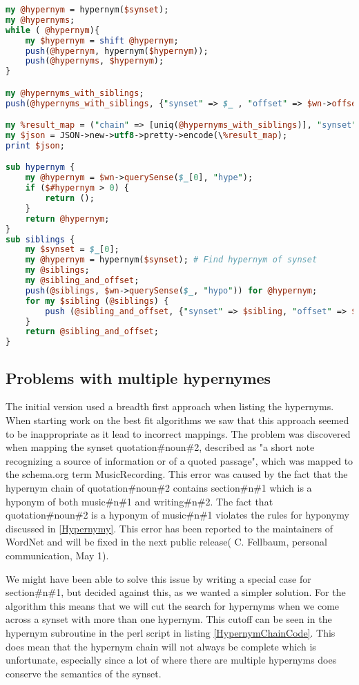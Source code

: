 \begin{lstlisting}[language=perl, label=HypernymChainCode, caption={Excerpt from the hypernym chain perl script}]
my @hypernym = hypernym($synset);
my @hypernyms;
while ( @hypernym){
	my $hypernym = shift @hypernym;
	push(@hypernym, hypernym($hypernym));
	push(@hypernyms, $hypernym);
}

my @hypernyms_with_siblings;
push(@hypernyms_with_siblings, {"synset" => $_ , "offset" => $wn->offset($_) ,"siblings" => [siblings($_)]}) for @hypernyms;

my %result_map = ("chain" => [uniq(@hypernyms_with_siblings)], "synset" => $synset, "offset"=> $wn->offset($synset), "siblings" => [siblings($synset)]);
my $json = JSON->new->utf8->pretty->encode(\%result_map);
print $json;

sub hypernym {
	my @hypernym = $wn->querySense($_[0], "hype");
	if ($#hypernym > 0) {
		return ();
	}
	return @hypernym;
}
sub siblings {
	my $synset = $_[0];
	my @hypernym = hypernym($synset); # Find hypernym of synset
	my @siblings;
	my @sibling_and_offset;
	push(@siblings, $wn->querySense($_, "hypo")) for @hypernym;
	for my $sibling (@siblings) {
		push (@sibling_and_offset, {"synset" => $sibling, "offset" => $wn->offset($sibling)});
	}
	return @sibling_and_offset;
}
\end{lstlisting}

\subsection{Problems with multiple hypernymes}
The initial version used a breadth first approach when listing the hypernyms.
When starting work on the best fit algorithms we saw that this approach seemed to be inappropriate as it lead to incorrect mappings.
The problem was discovered when mapping the synset quotation\#noun\#2,
described as "a short note recognizing a source of information or of a quoted passage",
which was mapped to the schema.org term MusicRecording.
This error was caused by the fact that the hypernym chain of quotation\#noun\#2 contains
section\#n\#1 which is a hyponym of both music\#n\#1 and writing\#n\#2.
The fact that quotation\#noun\#2 is a hyponym of music\#n\#1 violates the rules for hyponymy discussed in \ref{Hypernymy}.
This error has been reported to the maintainers of WordNet and will be fixed in the next public release( C. Fellbaum, personal communication, May 1).

We might have been able to solve this issue by writing a special case for section\#n\#1, but decided against this,
as we wanted a simpler solution.
For the algorithm this means that we will cut the search for hypernyms when we come across a synset with more than one hypernym.
This cutoff can be seen in the hypernym subroutine in the perl script in listing \ref{HypernymChainCode}.
This does mean that the hypernym chain will not always be complete which is unfortunate,
especially since a lot of where there are multiple hypernyms does conserve the semantics of the synset.


